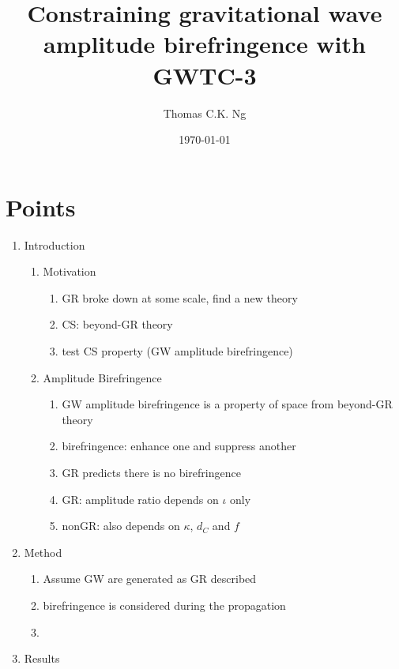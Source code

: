 \documentclass[twocolumn]{aastex631}
\begin{document}
\title{Constraining gravitational wave amplitude birefringence with GWTC-3}

\author{Thomas C.K. Ng}

\date{\today}

\begin{abstract}
    
\end{abstract}

\section{Points}

\begin{enumerate}
    \item Introduction
    \begin{enumerate}
        \item Motivation
        \begin{enumerate}
            \item GR broke down at some scale, find a new theory
            \item CS: beyond-GR theory
            \item test CS property (GW amplitude birefringence)
        \end{enumerate}
        \item Amplitude Birefringence
        \begin{enumerate}
            \item GW amplitude birefringence is a property of space from beyond-GR theory
            \item birefringence: enhance one and suppress another
            \item GR predicts there is no birefringence
            \item GR: amplitude ratio depends on $\iota$ only
            \item nonGR: also depends on $\kappa$, $d_C$ and $f$
        \end{enumerate}
    \end{enumerate}
    \item Method
    \begin{enumerate}
        \item Assume GW are generated as GR described
        \item birefringence is considered during the propagation
        \item 
    \end{enumerate}
    \item Results

\end{enumerate}
\end{document}
